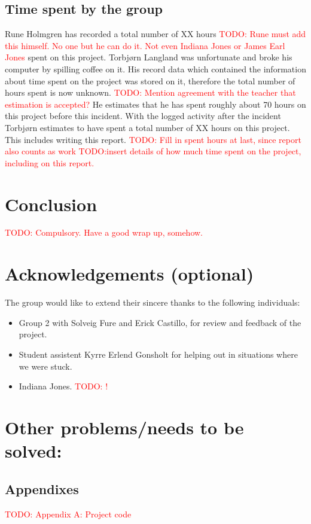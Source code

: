 \documentclass[a4paper]{IEEEtran}
\newcommand\TODO[1]{\textcolor{red}{TODO:#1}}
\newcommand\todo[1]{\TODO{#1}}
\begin{document}
\subsection{Time spent by the group}
Rune Holmgren has recorded a total number of XX hours \todo{ Rune must add this himself. No one but he can do it. Not even Indiana Jones or James Earl Jones} spent on this project.
\break
Torbjørn Langland was unfortunate and broke his computer by spilling coffee on it.
His record data which contained the information about time spent on the project was stored on it, therefore the total number of hours spent is now unknown.
\todo{ Mention agreement with the teacher that estimation is accepted?}
He estimates that he has spent roughly about 70 hours on this project before this incident.
With the logged activity after the incident Torbjørn estimates to have spent a total number of XX hours on this project.
This includes writing this report.
\todo{ Fill in spent hours at last, since report also counts as work}
\todo{insert details of how much time spent on the project, including on this report.}

\section{Conclusion}
\todo{ Compulsory. Have a good wrap up, somehow. }

\section{Acknowledgements (optional)}
The group would like to extend their sincere thanks to the following individuals:
\begin{itemize}
    \item Group 2 with Solveig Fure and Erick Castillo, for review and feedback of the project.
    \item Student assistent Kyrre Erlend Gonsholt for helping out in situations where we were stuck.
    \item Indiana Jones. \todo{ ! }
\end{itemize}


\section{ Other problems/needs to be solved:}
\subsection{ Appendixes}
\todo{ Appendix A: Project code }
\break
\end{document}
